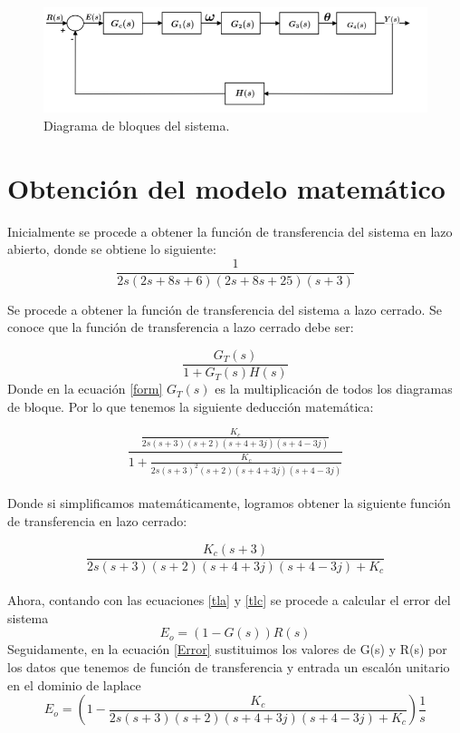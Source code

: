 \documentclass[12pt,letterpaper]{article}
\begin{document}
 \begin{figure}[H]
            \centering
            \includegraphics{DiagramaBloques.PNG}
            \caption{ Diagrama de bloques del sistema.}
            \label{files}
\end{figure} 

\section{Obtención del modelo matemático}

 Inicialmente se procede a obtener la función de transferencia del sistema en lazo abierto, donde se obtiene lo siguiente:\\

\begin{equation}
    \frac{1}{2s(2s+8s+6)(2s+8s+25)(s+3)}
    \label{tla}
\end{equation}

Se procede a obtener la función de transferencia del sistema a lazo cerrado. Se conoce que la función de transferencia a lazo cerrado debe ser:

\begin{equation}
    \frac{G_{T}(s)}{1+G_{T}(s)H(s)}
    \label{form}
\end{equation}
Donde en la ecuación \ref{form} $G_{T}(s)$ es la multiplicación de todos los diagramas de bloque.
Por lo que tenemos la siguiente deducción matemática:

$$\frac{\displaystyle \frac{K_{c}}{2s(s+3)(s+2)(s+4+3j)(s+4-3j)}}{\displaystyle 1+\frac{K_{c}}{2s(s+3)^{2}(s+2)(s+4+3j)(s+4-3j)}} $$\\

Donde si simplificamos matemáticamente, logramos obtener la siguiente función de transferencia en lazo cerrado:

\begin{equation}
    \frac{K_{c}(s+3)}{2s(s+3)(s+2)(s+4+3j)(s+4-3j)+K_{c}}
    \label{tlc}
\end{equation}\\

Ahora, contando con las ecuaciones \ref{tla} y \ref{tlc} se procede a calcular el error del sistema
\begin{equation}
    {E_{o}=(1 - G(s))R(s)}
    \label{Error}
\end{equation}
Seguidamente, en la ecuación \ref{Error} sustituimos los valores de G(s) y R(s) por los datos que tenemos de función de transferencia y entrada un escalón unitario en el dominio de laplace
$${E_{o}=(1 - \frac{K_{c}}{2s(s+3)(s+2)(s+4+3j)(s+4-3j)+K_{c}})\frac{1}{s}}$$
\end{document}
